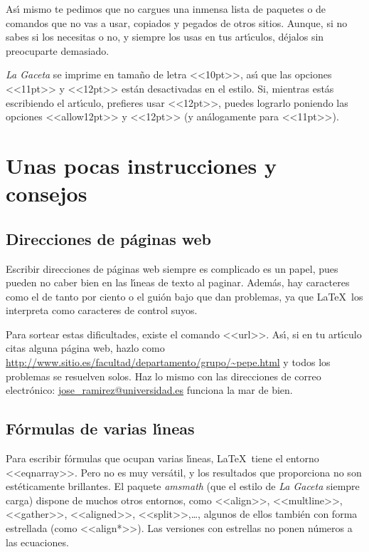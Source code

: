 \documentclass[autocontact]{gaceta}
\begin{document}
As\'{\i} mismo te pedimos que no cargues una inmensa lista de paquetes o de comandos que no vas a usar, copiados y pegados de otros sitios. Aunque, si no sabes si los necesitas o no, y siempre los usas en tus art\'{\i}culos, d\'ejalos sin preocuparte demasiado.

\textit{La Gaceta} se imprime en tama\~no de letra <<10pt>>, as\'{\i} que las opciones <<11pt>> y <<12pt>> est\'an desactivadas en el estilo. Si, mientras est\'as escribiendo el art\'{\i}culo, prefieres usar <<12pt>>, puedes lograrlo poniendo las opciones <<allow12pt>> y <<12pt>> (y an\'alogamente para <<11pt>>).


\section{Unas pocas instrucciones y consejos}

\subsection{Direcciones de p\'aginas web}

Escribir direcciones de p\'aginas web siempre es complicado es un papel, pues pueden no caber bien en las l\'{\i}neas de texto al paginar. Adem\'as, hay caracteres como el de tanto por ciento o el gui\'on bajo que dan problemas, ya que \LaTeX\ los interpreta como caracteres de control suyos.

Para sortear estas dificultades, existe el comando <<url>>. As\'{\i}, si en tu art\'{\i}culo citas alguna p\'agina web, hazlo como
\url{http://www.sitio.es/facultad/departamento/grupo/~pepe.html}
y todos los problemas se resuelven solos. Haz lo mismo con las direcciones de correo electr\'onico: \url{jose_ramirez@universidad.es} funciona la mar de bien.


\subsection{F\'ormulas de varias l\'{\i}neas}

Para escribir f\'ormulas que ocupan varias l\'{\i}neas, \LaTeX\ tiene el entorno <<eqnarray>>. Pero no es muy vers\'atil, y los resultados que proporciona no son est\'eticamente brillantes. El paquete \textit{amsmath} (que el estilo de \textit{La Gaceta} siempre carga) dispone de muchos otros entornos, como <<align>>, <<multline>>, <<gather>>, <<aligned>>, <<split>>,\dots, algunos de ellos tambi\'en con forma estrellada (como <<align*>>). Las versiones con estrellas no ponen n\'umeros a las ecuaciones.
\end{document}

